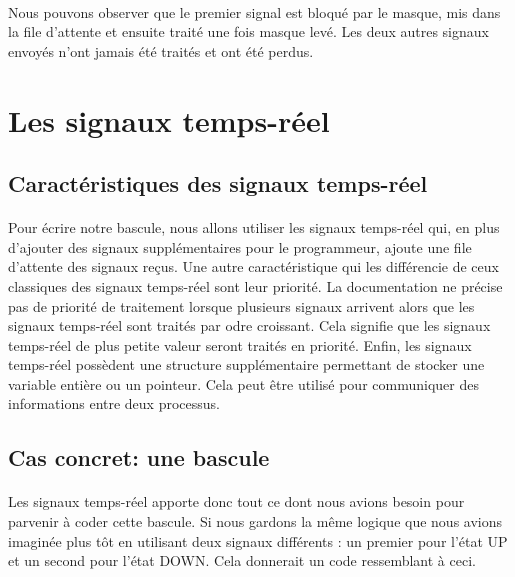 \documentclass{article}
\begin{document}


\paragraph{} Nous pouvons observer que le premier signal est bloqué par le masque, mis dans la file d'attente et ensuite traité une fois masque levé. Les deux autres signaux envoyés
n'ont jamais été traités et ont été perdus.

\section{Les signaux temps-réel}

\subsection{Caractéristiques des signaux temps-réel}

\paragraph{} Pour écrire notre bascule, nous allons utiliser les signaux temps-réel qui, en plus d'ajouter des signaux supplémentaires pour le programmeur, ajoute une file d'attente
des signaux reçus. Une autre caractéristique qui les différencie de ceux classiques des signaux temps-réel sont leur priorité. La documentation ne précise pas de priorité de traitement
lorsque plusieurs signaux arrivent alors que les signaux temps-réel sont traités par odre croissant. Cela signifie que les signaux temps-réel de plus petite valeur seront traités 
en priorité. Enfin, les signaux temps-réel possèdent une structure supplémentaire permettant de stocker une variable entière ou un pointeur. Cela peut être utilisé pour communiquer 
des informations entre deux processus.

\subsection{Cas concret: une bascule}

\paragraph{} Les signaux temps-réel apporte donc tout ce dont nous avions besoin pour parvenir à coder cette bascule. Si nous gardons la même logique que nous avions imaginée plus tôt
en utilisant deux signaux différents : un premier pour l'état UP et un second pour l'état DOWN. Cela donnerait un code ressemblant à ceci.
\end{document}
